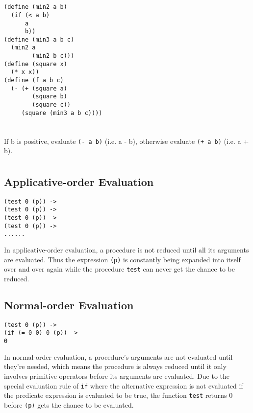 \documentclass[a4paper]{report}
\begin{document}

\section{}

\begin{lstlisting}
(define (min2 a b)
  (if (< a b)
      a
      b))
(define (min3 a b c)
  (min2 a
        (min2 b c)))
(define (square x)
  (* x x))
(define (f a b c)
  (- (+ (square a)
        (square b)
        (square c))
     (square (min3 a b c))))
\end{lstlisting}


\section{}

If b is positive, evaluate \lstinline{(- a b)} (i.e. a - b), otherwise evaluate \lstinline{(+ a b)} (i.e. a + b).


\section{}

\subsection*{Applicative-order Evaluation}

\begin{lstlisting}
(test 0 (p)) ->
(test 0 (p)) ->
(test 0 (p)) ->
(test 0 (p)) ->
......
\end{lstlisting}

In applicative-order evaluation, a procedure is not reduced until all its arguments are evaluated. Thus the expression \lstinline{(p)} is constantly being expanded into itself over and over again while the procedure \lstinline{test} can never get the chance to be reduced.

\subsection*{Normal-order Evaluation}

\begin{lstlisting}
(test 0 (p)) ->
(if (= 0 0) 0 (p)) ->
0
\end{lstlisting}

In normal-order evaluation, a procedure's arguments are not evaluated until they're needed, which means the procedure is always reduced until it only involves primitive operators before its arguments are evaluated. Due to the special evaluation rule of \lstinline{if} where the alternative expression is not evaluated if the predicate expression is evaluated to be true, the function \lstinline{test} returns 0 before \lstinline{(p)} gets the chance to be evaluated.
\end{document}
